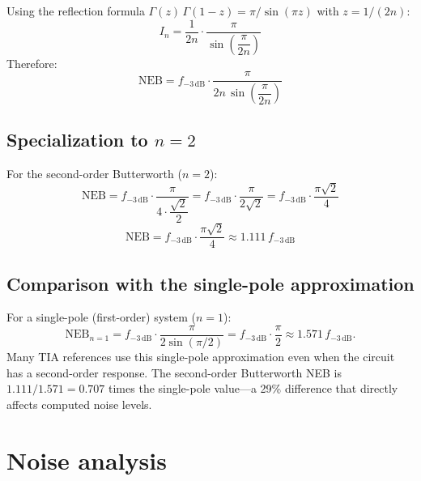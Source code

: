 \documentclass[a4paper,11pt]{article}
\begin{document}
Using the reflection formula
$\Gamma(z)\,\Gamma(1-z) = \pi/\sin(\pi z)$ with $z = 1/(2n)$:
\begin{equation}
  I_n = \frac{1}{2n} \cdot
        \frac{\pi}{\sin\!\left(\dfrac{\pi}{2n}\right)}
  \label{eq:In}
\end{equation}
Therefore:
\begin{equation}
  \mathrm{NEB}
  = f_{-3\,\mathrm{dB}} \cdot
    \frac{\pi}{2n\,\sin\!\left(\dfrac{\pi}{2n}\right)}
  \label{eq:neb-general}
\end{equation}

\subsection{Specialization to $n = 2$}

For the second-order Butterworth ($n = 2$):
\begin{equation*}
  \mathrm{NEB}
  = f_{-3\,\mathrm{dB}} \cdot
    \frac{\pi}{4 \cdot \dfrac{\sqrt{2}}{2}}
  = f_{-3\,\mathrm{dB}} \cdot \frac{\pi}{2\sqrt{2}}
  = f_{-3\,\mathrm{dB}} \cdot \frac{\pi\sqrt{2}}{4}
\end{equation*}
\begin{equation}
  \mathrm{NEB}
  = f_{-3\,\mathrm{dB}} \cdot \frac{\pi\sqrt{2}}{4}
  \approx 1.111\,f_{-3\,\mathrm{dB}}
  \label{eq:neb-2nd}
\end{equation}

\subsection{Comparison with the single-pole approximation}

For a single-pole (first-order) system ($n = 1$):
\begin{equation*}
  \mathrm{NEB}_{n=1}
  = f_{-3\,\mathrm{dB}} \cdot \frac{\pi}{2\sin(\pi/2)}
  = f_{-3\,\mathrm{dB}} \cdot \frac{\pi}{2}
  \approx 1.571\,f_{-3\,\mathrm{dB}}.
\end{equation*}
Many TIA references use this single-pole approximation even when the
circuit has a second-order response.  The second-order Butterworth NEB
is $1.111/1.571 = 0.707$ times the single-pole value---a 29\%
difference that directly affects computed noise levels.

\section{Noise analysis}
\label{sec:noise}
\end{document}
